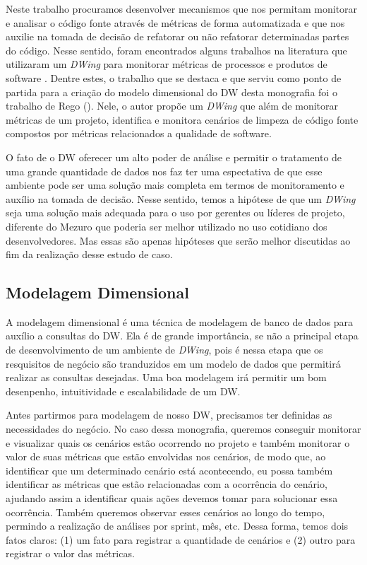Neste trabalho procuramos desenvolver mecanismos que nos permitam monitorar e analisar o código fonte através de métricas de forma automatizada e que nos auxilie na tomada de decisão de refatorar ou não refatorar determinadas partes do código. 
%
Nesse sentido, foram encontrados alguns trabalhos na literatura que utilizaram um \emph{DWing} para monitorar métricas de processos e produtos de software \cite{Folleco2007} \cite{Silveira2010}\cite{mazuco2011} \cite{rego2014}. Dentre estes, o trabalho que se destaca e que serviu como ponto de partida para a criação do modelo dimensional do DW desta monografia foi o trabalho de Rego (\citeyear{rego2014}). Nele, o autor propõe um \emph{DWing} que além de monitorar métricas de um projeto,  identifica e monitora cenários de limpeza de código fonte compostos por métricas relacionados a qualidade de software.

% 
O fato de o DW oferecer um alto poder de análise e permitir o tratamento de uma grande quantidade de dados nos faz ter uma espectativa de que esse ambiente pode ser uma solução mais completa em termos de monitoramento e auxílio na tomada de decisão. Nesse sentido, temos a hipótese de que um \emph{DWing} seja uma solução mais adequada para o uso por gerentes ou líderes de projeto, diferente do Mezuro que poderia ser melhor utilizado no uso cotidiano dos desenvolvedores. Mas essas são apenas hipóteses que serão melhor discutidas ao fim da realização desse estudo de caso.



\subsection{Modelagem Dimensional}

A modelagem dimensional é uma técnica de modelagem de banco de dados para auxílio a consultas do DW. Ela é de grande importância, se não a principal etapa de desenvolvimento de um ambiente de \emph{DWing}, pois é nessa etapa que os resquisitos de negócio são tranduzidos em um modelo de dados que permitirá realizar as consultas desejadas. Uma boa modelagem irá permitir um bom desenpenho, intuitividade e escalabilidade de um DW.

%
Antes partirmos para modelagem de nosso DW,  precisamos ter definidas as necessidades do negócio. No caso dessa monografia, queremos conseguir monitorar e visualizar quais os cenários estão ocorrendo no projeto e também monitorar o valor de suas métricas que estão envolvidas nos cenários, de modo que, ao identificar que um determinado cenário está acontecendo, eu possa também identificar as métricas que estão relacionadas com a ocorrência do cenário, ajudando assim a identificar quais ações devemos tomar para solucionar essa ocorrência. Também queremos observar esses cenários ao longo do tempo, permindo a realização de análises por sprint, mês, etc. Dessa forma, temos dois fatos claros: (1) um fato para registrar a quantidade de cenários e (2) outro para registrar o valor das métricas.

